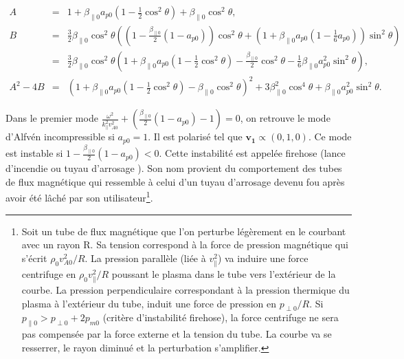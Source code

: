 \begin{eqnarray*}
    A &=& 1+ \beta_{\parallel 0}a_{p0} \left(1-\frac{1}{2}\cos^2 \theta\right)+\beta_{\parallel 0}\cos^2 \theta ,\\
    B &=& \frac{3}{2}\beta_{\parallel 0}\cos^2 \theta \left( \left( 1-\frac{\beta_{\parallel 0}}{2} \left( 1-a_{p0}\right)\right)\cos^2 \theta + \left( 1+\beta_{\parallel 0}a_{p0}\left(1-\frac{1}{6}a_{p0}\right)\right) \sin^2 \theta \right) \\
    &=&  \frac{3}{2}\beta_{\parallel 0}\cos^2 \theta \left(1+\beta_{\parallel 0} a_{p0} \left(1-\frac{1}{2}\cos^2 \theta \right)-\frac{\beta_{\parallel 0}}{2}\cos^2 \theta -\frac{1}{6} \beta_{\parallel 0}a^2_{p0}\sin^2 \theta \right) ,\\
    A^2-4B &=& \left(1+ \beta_{\parallel 0}a_{p0} \left(1-\frac{1}{2}\cos^2 \theta\right)-\beta_{\parallel 0}\cos^2 \theta\right)^2 + 3 \beta^2_{\parallel 0}\cos^4 \theta + \beta_{\parallel 0}a^2_{p0}\sin^2 \theta.
\end{eqnarray*}

Dans le premier mode $\frac{\omega^2}{k^2_{\parallel} v^2_{A0}} +   \left(\frac{\beta_{\parallel 0}}{2} \left(1-a_{p0}\right)-1\right)=0$, on retrouve le mode d'Alfvén incompressible si $a_{p0} = 1$. Il est polarisé tel que $\boldsymbol{v_1} \propto \left(0,1,0\right) $. Ce mode est instable si $ 1 -  \frac{\beta_{\parallel 0}}{2} \left(1-a_{p0}\right)<0$. Cette instabilité est appelée \og firehose \fg{} (\og lance d'incendie \fg{} ou \og tuyau d'arrosage \fg{}). Son nom provient du comportement des tubes de flux magnétique qui ressemble à celui d'un tuyau d'arrosage devenu fou après avoir été lâché par son utilisateur\footnote{Soit un tube de flux magnétique que l'on perturbe légèrement en le courbant avec un rayon R. Sa tension correspond à la force de pression magnétique qui s'écrit $\rho_0 v^2_{A0}/R$. La pression parallèle (liée à $v^2_{\parallel}$) va induire une force centrifuge en $\rho_0 v^2_{\parallel}/R$ poussant le plasma dans le tube vers l'extérieur de la courbe. La pression perpendiculaire correspondant à la pression thermique du plasma à l'extérieur du tube, induit une force de pression en $p_{\perp 0}/R$. Si $p_{\parallel 0} > p_{\perp 0} + 2 p_{m0} $ (critère d'instabilité firehose), la force centrifuge ne sera pas compensée par la force externe et la tension du tube. La courbe va se resserrer, le rayon diminué et la perturbation s'amplifier.}.

